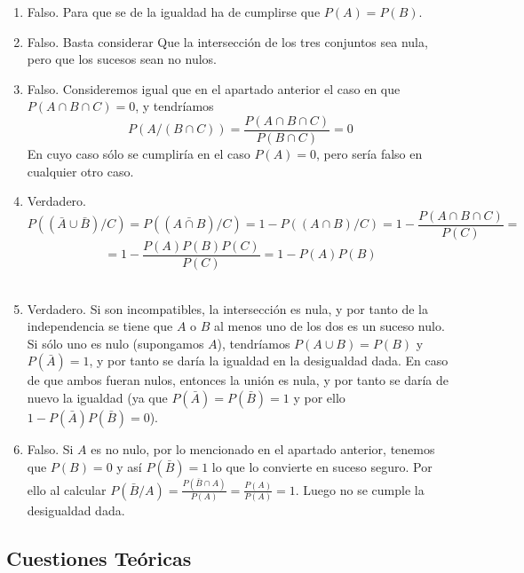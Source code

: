 \documentclass[fleqn]{article}
\begin{document}
\begin{enumerate}
\begin{enumerate}
                                \item Falso. Para que se de la igualdad ha de cumplirse que $P(A) = P(B)$.\\
                                \item Falso. Basta considerar Que la intersección de los tres conjuntos sea nula, pero que los sucesos sean no nulos.\\
                                \item Falso. Consideremos igual que en el apartado anterior el caso en que $P(A\cap B\cap C) = 0$, y tendríamos
                                $$P(A/(B\cap C)) = \frac{P(A\cap B\cap C)}{P(B\cap C)} = 0$$
                                En cuyo caso sólo se cumpliría en el caso $P(A)=0$, pero sería falso en cualquier otro caso.\\
                                \item Verdadero. $$P((\bar{A}\cup \bar{B})/C) = P((\bar{{A}\cap {B}})/C) = 1-P(({A}\cap {B})/C) = 1- \frac{P(A\cap B\cap C)}{P(C)} = $$
                                        $$=1- \frac{P(A)P(B)P(C)}{P(C)} = 1- P(A)P(B)$$\\
                                \item Verdadero. Si son incompatibles, la intersección es nula, y por tanto de la independencia se tiene que $A$ o $B$ al menos uno de
                                        los dos es un suceso nulo. Si sólo uno es nulo (supongamos $A$), tendríamos $P(A\cup B) = P(B)$ y $P(\bar{A})=1$, y por tanto se 
                                        daría la igualdad en la desigualdad dada. En caso de que ambos fueran nulos, entonces la unión es nula, y por tanto se daría de nuevo
                                        la igualdad (ya que $P(\bar{A})=P(\bar{B})=1$ y por ello $1-P(\bar{A})P(\bar{B})=0$).\\
                                \item Falso. Si $A$ es no nulo, por lo mencionado en el apartado anterior, tenemos que $P(B)=0$ y así $P(\bar{B}) = 1$ lo que lo convierte
                                        en suceso seguro. Por ello al calcular
                                        $P(\bar{B}/A)=\frac{P(\bar{B}\cap A)}{P(A)} = \frac{P(A)}{P(A)} = 1$. Luego no se cumple la desigualdad dada.
                        \end{enumerate} 


                \newpage

                \subsection{Cuestiones Teóricas}


\end{enumerate}
\end{document}
